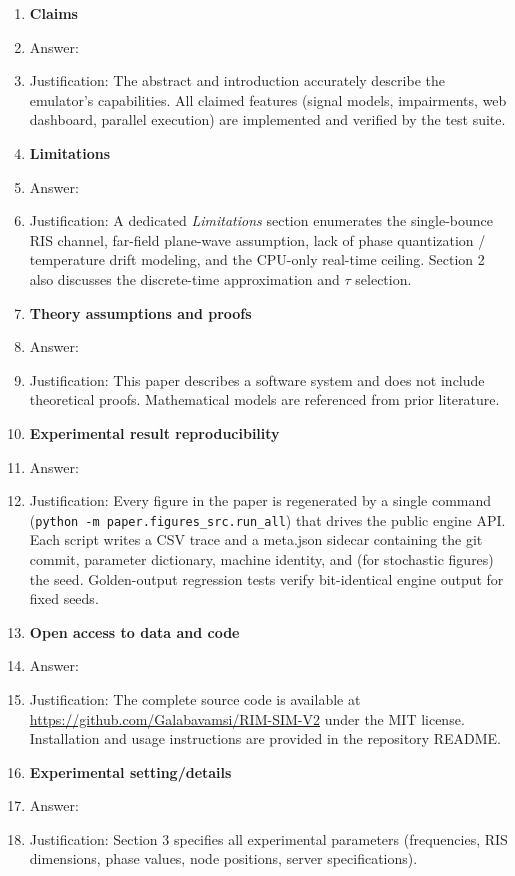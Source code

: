 \documentclass{article}
\begin{document}
\begin{enumerate}
\item {\bf Claims}
    \item[] Answer: \answerYes{}
    \item[] Justification: The abstract and introduction accurately describe the emulator's capabilities. All claimed features (signal models, impairments, web dashboard, parallel execution) are implemented and verified by the test suite.

\item {\bf Limitations}
    \item[] Answer: \answerYes{}
    \item[] Justification: A dedicated \emph{Limitations} section enumerates the single-bounce RIS channel, far-field plane-wave assumption, lack of phase quantization / temperature drift modeling, and the CPU-only real-time ceiling. Section 2 also discusses the discrete-time approximation and $\tau$ selection.

\item {\bf Theory assumptions and proofs}
    \item[] Answer: \answerNA{}
    \item[] Justification: This paper describes a software system and does not include theoretical proofs. Mathematical models are referenced from prior literature.

\item {\bf Experimental result reproducibility}
    \item[] Answer: \answerYes{}
    \item[] Justification: Every figure in the paper is regenerated by a single command (\texttt{python -m paper.figures\_src.run\_all}) that drives the public engine API. Each script writes a CSV trace and a meta.json sidecar containing the git commit, parameter dictionary, machine identity, and (for stochastic figures) the seed. Golden-output regression tests verify bit-identical engine output for fixed seeds.

\item {\bf Open access to data and code}
    \item[] Answer: \answerYes{}
    \item[] Justification: The complete source code is available at \url{https://github.com/Galabavamsi/RIM-SIM-V2} under the MIT license. Installation and usage instructions are provided in the repository README.

\item {\bf Experimental setting/details}
    \item[] Answer: \answerYes{}
    \item[] Justification: Section 3 specifies all experimental parameters (frequencies, RIS dimensions, phase values, node positions, server specifications).


\end{enumerate}
\end{document}
